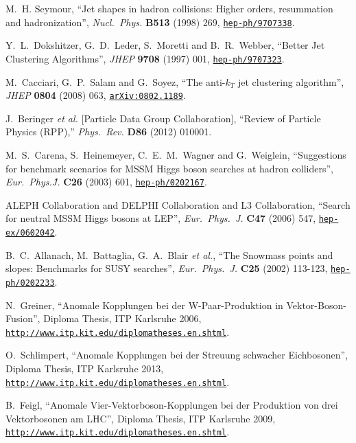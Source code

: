 \documentclass[english,12pt]{article}
\begin{document}
\begin{thebibliography}{10}
M.~H. Seymour, ``{Jet shapes in hadron collisions: Higher orders, resummation
  and hadronization}'', {\em Nucl.\ Phys.} {\bf B513} (1998) 269,
\href{http://www.arXiv.org/abs/hep-ph/9707338}{{\tt hep-ph/9707338}}.

  Y.~L.~Dokshitzer, G.~D.~Leder, S.~Moretti and B.~R.~Webber,
  ``Better Jet Clustering Algorithms'',
  {\em JHEP} {\bf 9708} (1997) 001,
  \href{http://arxiv.org/abs/hep-ph/9707323}{{\tt hep-ph/9707323}}.

  M.~Cacciari, G.~P.~Salam and G.~Soyez,
  ``The anti-$k_T$ jet clustering algorithm'',
  {\em JHEP} {\bf 0804} (2008) 063,
  \href{http://arxiv.org/abs/0802.1189}{{\tt arXiv:0802.1189}}.

  J.~Beringer {\it et al.}  [Particle Data Group Collaboration],
  ``Review of Particle Physics (RPP),''
   {\em Phys.\ Rev.} {\bf D86} (2012) 010001.

  M.~S.~Carena, S.~Heinemeyer, C.~E.~M.~Wagner and G.~Weiglein,
  ``Suggestions for benchmark scenarios for MSSM Higgs boson searches at
  hadron colliders'',
  {\em Eur.\ Phys.\~J.} {\bf C26} (2003) 601,
\href{http://www.arXiv.org/abs/hep-ph/0202167}{{\tt hep-ph/0202167}}.

  ALEPH Collaboration and DELPHI Collaboration and L3 Collaboration,
  ``Search for neutral MSSM Higgs bosons at LEP'',
  {\em Eur.\ Phys.\ J.} {\bf C47} (2006) 547,
\href{http://www.arXiv.org/abs/hep-ex/0602042}{{\tt hep-ex/0602042}}.

  B.~C.~Allanach, M.~Battaglia, G.~A.~Blair {\it et al.},
  ``The Snowmass points and slopes: Benchmarks for SUSY searches'',
  {\em Eur.\ Phys.\ J.}  {\bf C25} (2002) 113-123,
\href{http://www.arXiv.org/abs/hep-ph/0202233}{{\tt hep-ph/0202233}}.
  
N.~Greiner, ``Anomale Kopplungen bei der W-Paar-Produktion in
  Vektor-Boson-Fusion'', {Diploma Thesis, ITP Karlsruhe 2006},
\href{http://www.itp.kit.edu/diplomatheses.en.shtml}{{\tt http://www.itp.kit.edu/diplomatheses.en.shtml}}.

O.~Schlimpert, ``Anomale Kopplungen bei der Streuung schwacher
Eichbosonen'', {Diploma Thesis, ITP Karlsruhe 2013}, 
\href{http://www.itp.kit.edu/diplomatheses.en.shtml}{{\tt http://www.itp.kit.edu/diplomatheses.en.shtml}}.

B.~Feigl, ``Anomale Vier-Vektorboson-Kopplungen bei der Produktion von drei 
    Vektorbosonen am LHC'', {Diploma Thesis, ITP Karlsruhe 2009}, 
\href{http://www.itp.kit.edu/diplomatheses.en.shtml}{{\tt http://www.itp.kit.edu/diplomatheses.en.shtml}}.


\end{thebibliography}
\end{document}
